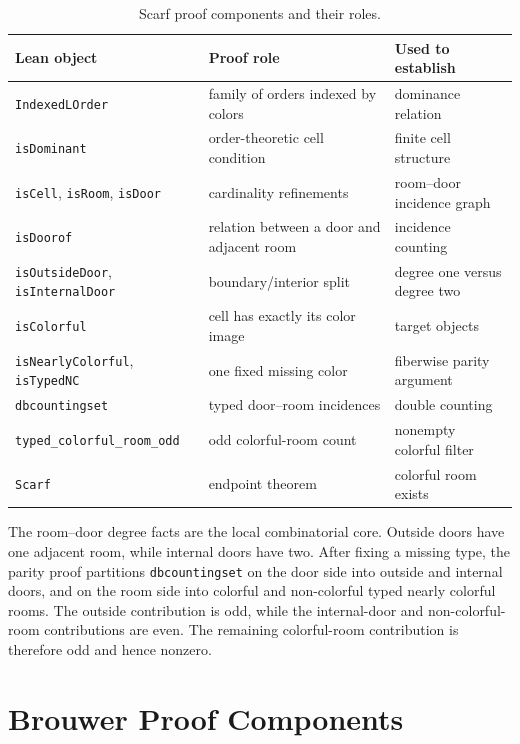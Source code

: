 \documentclass{article}
\theoremstyle{definition}
\begin{document}
\begin{table}[H]
\caption{Scarf proof components and their roles.}
\label{tab:appendix-scarf-components}
\begin{center}
    \begin{small}
      \begin{tabular}{lll}
\toprule
Lean object & Proof role & Used to establish \\
\midrule
\texttt{IndexedLOrder} & family of orders indexed by colors & dominance relation \\
\texttt{isDominant} & order-theoretic cell condition & finite cell structure \\
\texttt{isCell}, \texttt{isRoom}, \texttt{isDoor} & cardinality refinements & room--door incidence graph \\
\texttt{isDoorof} & relation between a door and adjacent room & incidence counting \\
\texttt{isOutsideDoor}, \texttt{isInternalDoor} & boundary/interior split & degree one versus degree two \\
\texttt{isColorful} & cell has exactly its color image & target objects \\
\texttt{isNearlyColorful}, \texttt{isTypedNC} & one fixed missing color & fiberwise parity argument \\
\texttt{dbcountingset} & typed door--room incidences & double counting \\
\texttt{typed\_colorful\_room\_odd} & odd colorful-room count & nonempty colorful filter \\
\texttt{Scarf} & endpoint theorem & colorful room exists \\
\bottomrule
\end{tabular}
    \end{small}
  \end{center}
  \vskip -0.1in
\end{table}

The room--door degree facts are the local combinatorial core. Outside doors have one adjacent room, while internal doors have two. After fixing a missing type, the parity proof partitions \texttt{dbcountingset} on the door side into outside and internal doors, and on the room side into colorful and non-colorful typed nearly colorful rooms. The outside contribution is odd, while the internal-door and non-colorful-room contributions are even. The remaining colorful-room contribution is therefore odd and hence nonzero.

\section{Brouwer Proof Components}
\label{app:brouwer-details}
\end{document}
